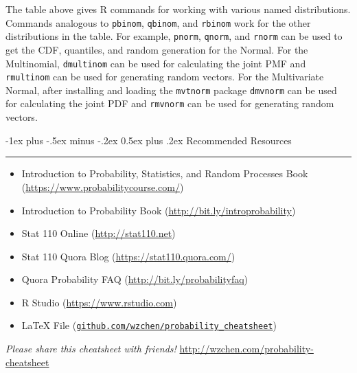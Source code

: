 \documentclass[10pt,landscape]{article}
\makeatletter
\renewcommand{\section}{\@startsection{section}{1}{0mm}%
{-1ex plus -.5ex minus -.2ex}%
{0.5ex plus .2ex}%
{\normalfont\large\bfseries}}
\makeatother
\begin{document}
\begin{multicols*}{3}
The table above gives R commands for working with various named distributions. Commands analogous to \texttt{pbinom}, \texttt{qbinom}, and \texttt{rbinom} work for the other distributions in the table. For example, \texttt{pnorm}, \texttt{qnorm}, and \texttt{rnorm} can be used to get the CDF, quantiles, and random generation for the Normal. For the Multinomial, \texttt{dmultinom} can be used for calculating the joint PMF and \texttt{rmultinom} can be used for generating random vectors. For the Multivariate Normal, after installing and loading the \texttt{mvtnorm} package \texttt{dmvnorm} can be used for calculating the joint PDF and \texttt{rmvnorm} can be used for generating random vectors.



\section{Recommended Resources} \smallskip \hrule height 2pt \smallskip
\begin{itemize}
\item Introduction to Probability, Statistics, and Random Processes Book (\url{https://www.probabilitycourse.com/})
\item Introduction to Probability Book (\url{http://bit.ly/introprobability})
\item Stat 110 Online (\url{http://stat110.net})
\item Stat 110 Quora Blog (\url{https://stat110.quora.com/})
\item Quora Probability FAQ (\url{http://bit.ly/probabilityfaq})
\item R Studio (\url{https://www.rstudio.com})
\item LaTeX File (\texttt{\href{https://github.com/wzchen/probability_cheatsheet}{github.com/wzchen/probability\_cheatsheet}})
\end{itemize}

\begin{center}\emph{Please share this cheatsheet with friends!} \url{http://wzchen.com/probability-cheatsheet}\end{center}

\end{multicols*}
\end{document}
